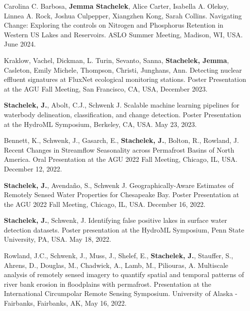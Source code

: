 \documentclass[11pt]{article}
\makeatletter
\newlength{\bibhang}
\newlength{\bibsep}
 {\@listi \global\bibsep\itemsep \global\advance\bibsep by\parsep}
\newenvironment{bibenum*}
  {\renewcommand\labelenumi{[\theenumi]}%
   \etaremune[
     topsep=0pt,
     itemsep=\bibsep,
     parsep=0pt,partopsep=0pt,
     itemindent=-\bibhang,
     leftmargin=0.8em
     ]
     }
  {\endetaremune}
\makeatother
\begin{document}
\begin{bibenum*}
    
    \item Carolina C. Barbosa, \textbf{Jemma Stachelek}, Alice Carter, Isabella A. Oleksy, Linnea A. Rock, Joshua Culpepper, Xiangzhen Kong, Sarah Collins. Navigating Change: Exploring the controls on Nitrogen and Phosphorus Retention in Western US Lakes and Reservoirs. ASLO Summer Meeting, Madison, WI, USA. June 2024.
    
    \item Kraklow, Vachel, Dickman, L. Turin, Sevanto, Sanna, \textbf{Stachelek, Jemma}, Casleton, Emily Michele, Thompson, Christi, Junghans, Ann. Detecting nuclear effluent signatures at FluxNet ecological monitoring stations. Poster Presentation at the AGU Fall Meeting, San Francisco, CA, USA, December 2023.

    \item \textbf{Stachelek, J.}, Abolt, C.J., Schwenk J. Scalable machine learning pipelines for waterbody delineation, classification, and change detection. Poster Presentation at the HydroML Symposium, Berkeley, CA, USA. May 23, 2023.

    \item Bennett, K., Schwenk, J., Gasarch, E., \textbf{Stachelek, J.}, Bolton, R., Rowland, J. Recent Changes in Streamflow Seasonality across Permafrost Basins of North America. Oral Presentation at the AGU 2022 Fall Meeting, Chicago, IL, USA. December 12, 2022.

    \item \textbf{Stachelek, J.}, Avendaño, S., Schwenk J. Geographically-Aware Estimates of Remotely Sensed Water Properties for Chesapeake Bay. Poster Presentation at the AGU 2022 Fall Meeting, Chicago, IL, USA. December 16, 2022.
    
    \item \textbf{Stachelek, J.}, Schwenk, J. Identifying false positive lakes in surface water detection datasets. Poster presentation at the HydroML Symposium, Penn State University, PA, USA. May 18, 2022.
    
    \item Rowland, J.C., Schwenk, J., Muss, J., Shelef, E., \textbf{Stachelek, J.}, Stauffer, S., Ahrens, D., Douglas, M., Chadwick, A., Lamb, M., Piliouras, A. Multiscale analysis of remotely sensed imagery to quantify spatial and temporal patterns of river bank erosion in floodplains with permafrost. Presentation at the International Circumpolar Remote Sensing Symposium. University of Alaska - Fairbanks, Fairbanks, AK, May 16, 2022.


\end{bibenum*}
\end{document}
